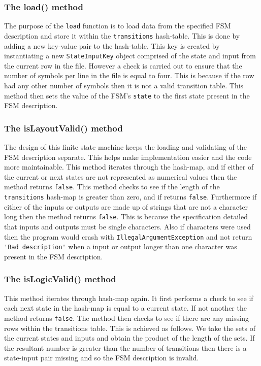 \documentclass{article}
\begin{document}
\subsubsection{The load() method}
The purpose of the \verb+load+ function is to load data from the specified FSM description and store it within the \verb+transitions+ hash-table. This is done by adding a new key-value pair to the hash-table. This key is created by instantiating a new \verb+StateInputKey+ object comprised of the state and input from the current row in the file. However a check is carried out to ensure that the number of symbols per line in the file is equal to four. This is because if the row had any other number of symbols then it is not a valid transition table. This method then sets the value of the FSM's \verb+state+ to the first state present in the FSM description.
\subsubsection{The isLayoutValid() method}
The design of this finite state machine keeps the loading and validating of the FSM description separate. This helps make implementation easier and the code more maintainable. This method iterates through the hash-map, and if either of the current or next states are not represented as numerical values then the method returns \verb+false+. This method checks to see if the length of the \verb+transitions+ hash-map is greater than zero, and if returns \verb+false+. Furthermore if either of the inputs or outputs are made up of strings that are not a character long then the method returns \verb+false+. This is because the specification detailed that inputs and outputs must be single characters. Also if characters were used then the program would crash with \verb+IllegalArgumentException+ and not return \verb+'Bad description'+ when a input or output longer than one character was present in the FSM description.
\subsubsection{The isLogicValid() method}
This method iterates through hash-map again. It first performs a check to see if each next state in the hash-map is equal to a current state. If not another the method returns \verb+false+. The method then checks to see if  there are any missing rows within the transitions table. This is achieved as follows. We take the sets of the current states and inputs and obtain the product of the length of the sets. If the resultant number is greater than the number of transitions then there is a state-input pair missing and so the FSM description is invalid.
\end{document}
